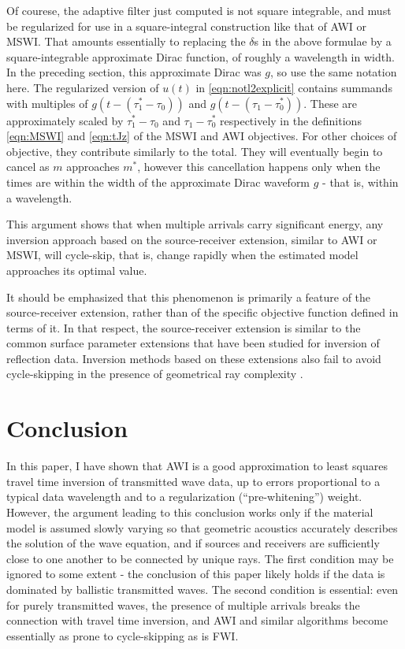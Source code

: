 Of courese, the adaptive filter just computed is not square
integrable, and must be regularized for use in a square-integral
construction like that of AWI or MSWI. That amounts essentially to
replacing the $\delta$s in the above formulae by a square-integrable
approximate Dirac function, of roughly a wavelength in width. In the
preceding section, this approximate Dirac was $g$, so use the same
notation here. The regularized version of $u(t)$ in
\ref{eqn:notl2explicit} contains summands with multiples of $g(t-(\tau^*_1-\tau_0))$
and $g(t-(\tau_1-\tau^*_0))$. These are approximately scaled by
$\tau^*_1-\tau_0$ and $\tau_1-\tau^*_0$ respectively in the
definitions \ref{eqn:MSWI} and \ref{eqn:tJz} of the MSWI and AWI
objectives. For other choices of objective, they contribute similarly
to the total. They will eventually begin to cancel as $m$ approaches
$m^*$, however this cancellation happens only when the times are
within the width of the approximate 
Dirac waveform $g$ - that is, within a wavelength.

This argument shows that when multiple arrivals carry significant energy, any
inversion approach based on the source-receiver extension, similar to
AWI or MSWI, will cycle-skip, that is, change rapidly when the
estimated model approaches its optimal value.

It should be emphasized that this phenomenon is primarily a feature of the
source-receiver extension, rather than of the specific objective
function defined in terms of it. In that respect, the source-receiver
extension is similar to the common surface parameter extensions that
have been studied for inversion of reflection data. Inversion methods
based on these extensions also fail to avoid cycle-skipping in the presence of
geometrical ray complexity \cite[]{geoprosp:2008}.

\section{Conclusion}
In this paper, I have shown that AWI is a good approximation to least
squares travel time inversion of transmitted wave data, up to errors proportional to a typical
data wavelength and to a regularization (``pre-whitening'')
weight. However, the argument leading to this conclusion works only if
the material model is assumed slowly varying so that geometric
acoustics accurately describes the solution of the wave equation, and if
sources and receivers are sufficiently close to one another to be
connected by unique rays. The first condition may be ignored to some
extent - the conclusion of this paper likely holds if the data is
dominated by ballistic transmitted waves. The second condition
is essential: even for purely transmitted waves, the presence of
multiple arrivals breaks the connection
with travel time inversion, and AWI and similar algorithms
become essentially as prone to cycle-skipping as is FWI.

